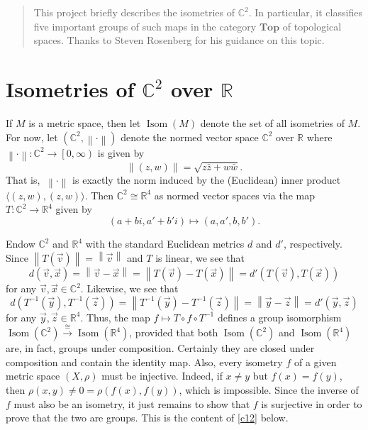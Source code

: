 \documentclass[10pt,letterpaper,cm]{nupset}
\theoremstyle{definition}
\theoremstyle{theorem}
\theoremstyle{remark}
\newcommand{\C}{\mathbb C}
\newcommand{\R}{\mathbb R}
\newcommand{\1}{\mathbf{1}}
\renewcommand{\v}{\vec v}
\newcommand{\x}{\vec x}
\newcommand{\y}{\vec y}
\newcommand{\z}{\vec z}
\newcommand{\0}{\vec {0}}
\DeclareMathOperator{\Isom}{Isom}
\begin{document}
\begin{abstract}
This project briefly describes the isometries of $\C^2$. In particular, it classifies five important groups of such maps in the category $\mathbf{Top}$ of topological spaces. Thanks to Steven Rosenberg for his guidance on this topic.
\end{abstract}

\smallskip

\section{Isometries of $\C^2$ over $\R$}

If $M$ is a metric space, then let $\Isom(M)$ denote the set of all isometries of $M$. For now, let $\left(\C^2,  \left\lVert{\cdot}\right\rVert\right)$ denote the normed vector space $\C^2$ over $\R$ where $ \left\lVert{\cdot}\right\rVert : \C^2\to \left[0,\infty\right)$ is given by  $$ \left\lVert{(z,w)}\right\rVert=\sqrt{z\bar{z}+w\bar{w}}.$$ That is, $\ \left\lVert{\cdot}\right\rVert$ is exactly the norm induced by the (Euclidean) inner product $\langle (z,w), (z,w) \rangle$. Then $\C^2\cong \R^4$ as normed vector spaces via the map $T: \C^2 \to \R^4$ given by 
\[ \label{eqn:T}
\left(a+bi, a'+b'i\right)\mapsto \left(a,a',b,b'\right)
\tag{$\ast$}.\] 


	Endow $\C^2$ and $\R^4$ with the standard Euclidean metrics $d$ and $d'$, respectively. Since $ \left\lVert{T(\v)}\right\rVert= \left\lVert{\v}\right\rVert$ and $T$ is linear, we see that $$d(\v, \x)= \left\lVert{\v-\x}\right\rVert= \left\lVert{T(\v) -T(\x)}\right\rVert=d'(T(\v), T(\x))$$ for any $\v, \x \in \C^2.$ Likewise, we see that $$d(T^{-1}(\y), T^{-1}(\z))= \left\lVert{T^{-1}(\y)-T^{-1}(\z)}\right\rVert= \left\lVert{\y-\z}\right\rVert=d'(\y,\z)$$ for any $\y, \z \in \R^4$.
Thus, the map $f\mapsto T\circ f \circ T^{-1}$ defines a group isomorphism $\Isom(\C^2) \overset{\cong}{\longrightarrow} \Isom(\R^4)$, provided that both $\Isom(\C^2)$ and $\Isom(\R^4)$ are, in fact, groups under composition. Certainly they are closed under composition and contain the identity map. Also, every isometry $f$ of a given metric space $\left(X, \rho\right)$ must be injective. Indeed, if $x\ne y$ but $f(x)=f(y)$, then $\rho(x,y)\ne 0 = \rho(f(x),f(y))$, which is impossible. Since the inverse of $f$ must also be an isometry, it just remains to show that $f$ is surjective in order to prove that the two are groups. This is the content of \cref{c12} below. 

\medskip
\end{document}
